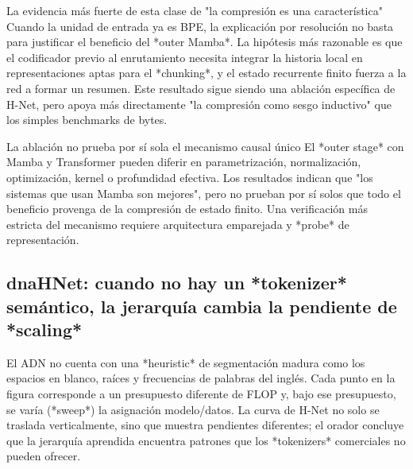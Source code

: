 
\begin{importantbox}{La evidencia más fuerte de esta clase de "la compresión es una característica"}
Cuando la unidad de entrada ya es BPE, la explicación por resolución no basta para justificar el beneficio del *outer Mamba*. La hipótesis más razonable es que el codificador previo al enrutamiento necesita integrar la historia local en representaciones aptas para el *chunking*, y el estado recurrente finito fuerza a la red a formar un resumen. Este resultado sigue siendo una ablación específica de H-Net, pero apoya más directamente "la compresión como sesgo inductivo" que los simples benchmarks de bytes.
\end{importantbox}

\begin{warningbox}{La ablación no prueba por sí sola el mecanismo causal único}
El *outer stage* con Mamba y Transformer pueden diferir en parametrización, normalización, optimización, kernel o profundidad efectiva. Los resultados indican que "los sistemas que usan Mamba son mejores", pero no prueban por sí solos que todo el beneficio provenga de la compresión de estado finito. Una verificación más estricta del mecanismo requiere arquitectura emparejada y *probe* de representación.
\end{warningbox}

\subsection{dnaHNet: cuando no hay un *tokenizer* semántico, la jerarquía cambia la pendiente de *scaling*}

El ADN no cuenta con una *heuristic* de segmentación madura como los espacios en blanco, raíces y frecuencias de palabras del inglés. Cada punto en la figura corresponde a un presupuesto diferente de FLOP y, bajo ese presupuesto, se varía (*sweep*) la asignación modelo/datos. La curva de H-Net no solo se traslada verticalmente, sino que muestra pendientes diferentes; el orador concluye que la jerarquía aprendida encuentra patrones que los *tokenizers* comerciales no pueden ofrecer.


